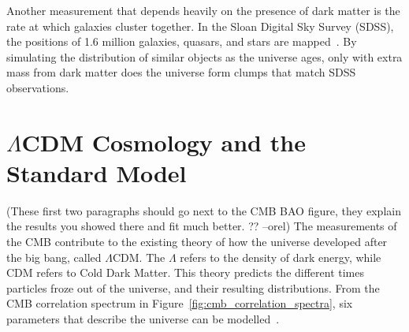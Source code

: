 Another measurement that depends heavily on the presence of dark matter is the rate at which galaxies cluster together.
In the Sloan Digital Sky Survey (SDSS), the positions of 1.6 million galaxies, quasars, and stars are mapped~\cite{sdss_release}.
By simulating the distribution of similar objects as the universe ages, only with extra mass from dark matter does the universe form clumps that match SDSS observations.



\section{$\Lambda$CDM Cosmology and the Standard Model}

{\color{red}(These first two paragraphs should go next to the CMB BAO figure, they explain the results you showed there and fit much better. ?? --orel)}
The measurements of the CMB contribute to the existing theory of how the universe developed after the big bang, called $\Lambda$CDM.
The $\Lambda$ refers to the density of dark energy, while CDM refers to Cold Dark Matter.
This theory predicts the different times particles froze out of the universe, and their resulting distributions.
From the CMB correlation spectrum in Figure~\ref{fig:cmb_correlation_spectra}, six parameters that describe the universe can be modelled~\cite{planck_dm_limit,planck_2013_parameters}.

%   

